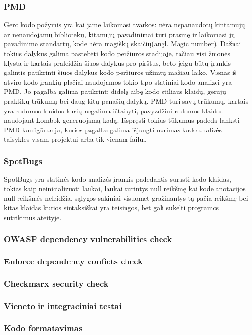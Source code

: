 \documentclass{VUMIFPSkursinis}
\begin{document}
		\subsubsection{PMD}
			Gero kodo požymis yra kai jame laikomasi tvarkos: nėra nepanaudotų kintamūjų ar nenaudojamų bibliotekų, kitamūjų pavadinimai turi prasmę ir laikomasi jų pavadinimo standartų, kode nėra magiškų skaičių(angl. Magic number). Dažnai tokius dalykus galima pastebėti kodo peržiūros stadijoje, tačiau visi žmonės klysta ir kartais praleidžia šiuos dalykus pro pirštus, beto jeigu būtų įrankis galintis patikrinti šiuos dalykus kodo peržiūros užimtų mažiau laiko.
			Vienas iš atviro kodo įrankių plačiai naudojamos tokio tipo statiniai kodo analizei yra PMD. Jo pagalba galima patikrinti didelę aibę kodo stiliaus klaidų, gerūjų praktikų trūkumų bei daug kitų panašių dalykų.
			PMD turi savų trūkumų, kartais yra rodomos klaidos kurių negalima ištaisyti, pavyzdžiui rodomos klaidos naudojant Lombok generuojamą kodą.
			Išspręsti tokius tūkumus padeda lanksti PMD konfigūracija, kurios pagalba galima išjungti norimas kodo analizės taisykles visam projektui arba tik vienam failui.
		\subsubsection{SpotBugs}
			SpotBugs yra statinės kodo analizės įrankis padedantis surasti kodo klaidas, tokias kaip neinicializuoti laukai, laukai turintys null reikšmę kai kode anotacijos null reikšmės neleidžia, sąlygos sakiniai visuomet gražinantys tą pačia reikšmę bei kitas klaidas kurios sintaksiškai yra teisingos, bet gali sukelti programos sutrikimus ateityje. 
		\subsubsection{OWASP dependency vulnerabilities check}
		\subsubsection{Enforce dependency conficts check}
		\subsubsection{Checkmarx security check}
		\subsubsection{Vieneto ir integraciniai testai}
		\subsubsection{Kodo formatavimas}
\end{document}

